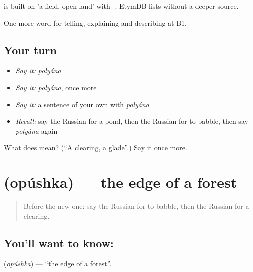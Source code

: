 \begin{cousinweb}
\emph{} is built on \emph{} 'a field, open land' with \emph{-}. EtymDB lists \emph{} without a deeper source.
\end{cousinweb}

\begin{grammarlens}[title={What you've built}]
One more word for telling, explaining and describing at B1.
\end{grammarlens}

\subsection*{Your turn}
\begin{itemize}
\raggedright
  \item \emph{Say it:} \emph{polyána}
  \item \emph{Say it:} \emph{polyána}, once more
  \item \emph{Say it:} a sentence of your own with \emph{polyána}
  \item \emph{Recall:} say the Russian for a pond, then the Russian for to babble, then say \emph{polyána} again
\end{itemize}

\begin{tcolorbox}[breakable,colback=teal!4,colframe=teal!35!black,title={Before you move on}]
What does  mean? (\textquotedblleft{}A clearing, a glade\textquotedblright{}.) Say it once more.
\end{tcolorbox}
\section[\texorpdfstring{\ru{опушка} (opúshka)}{опушка (opúshka)}]{ (opúshka) — the edge of a forest}

\label{lesson:RU-C461-opushka}



\begin{quote}
Before the new one: say the Russian for to babble, then the Russian for a clearing.
\end{quote}

\subsection*{You'll want to know: }
\textbf{} (\emph{opúshka}) — \textquotedblleft{}the edge of a forest\textquotedblright{}.

